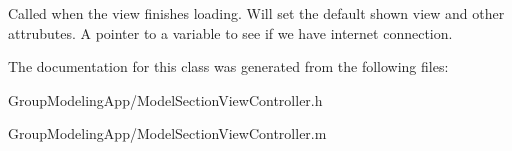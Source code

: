 Called when the view finishes loading. Will set the default shown view and other attrubutes. A pointer to a variable to see if we have internet connection. 

The documentation for this class was generated from the following files\-:\begin{DoxyCompactItemize}
\item 
Group\-Modeling\-App/Model\-Section\-View\-Controller.\-h\item 
Group\-Modeling\-App/Model\-Section\-View\-Controller.\-m\end{DoxyCompactItemize}
